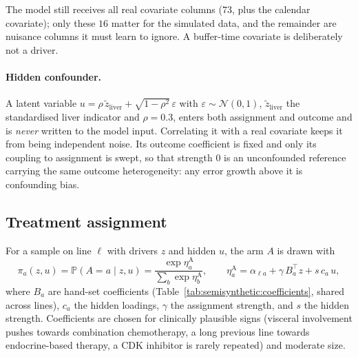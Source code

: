 The model still receives all real covariate columns ($73$, plus the calendar covariate); only
these $16$ matter for the simulated data, and the remainder are nuisance columns it must
learn to ignore. A buffer-time covariate is deliberately not a driver.

\paragraph{Hidden confounder.} A latent variable
$u=\rho\,\tilde z_{\text{liver}}+\sqrt{1-\rho^2}\,\varepsilon$ with $\varepsilon\sim\mathcal{N}(0,1)$,
$\tilde z_{\text{liver}}$ the standardised liver indicator and $\rho=0.3$, enters both
assignment and outcome and is \emph{never} written to the model input. Correlating it with a
real covariate keeps it from being independent noise. Its outcome coefficient is fixed and
only its coupling to assignment is swept, so that strength $0$ is an unconfounded reference
carrying the same outcome heterogeneity: any error growth above it is confounding bias.

\subsection{Treatment assignment}
\label{app:semisynthetic:assignment}

For a sample on line $\ell$ with drivers $z$ and hidden $u$, the arm $A$ is drawn with
\begin{equation}
    \pi_a(z,u)=\mathbb{P}(A=a\mid z,u)
    =\frac{\exp\eta^{\text{A}}_a}{\sum_{b}\exp\eta^{\text{A}}_b},
    \qquad
    \eta^{\text{A}}_a=\alpha_{\ell a}+\gamma\,B_a^{\top}z+s\,c_a\,u,
    \label{eq:semisynthetic:assignment}
\end{equation}
where $B_a$ are hand-set coefficients (Table~\ref{tab:semisynthetic:coefficients}, shared
across lines), $c_a$ the hidden loadings, $\gamma$ the assignment strength, and $s$ the hidden
strength. Coefficients are chosen for clinically plausible signs (visceral involvement pushes
towards combination chemotherapy, a long previous line towards endocrine-based therapy, a CDK
inhibitor is rarely repeated) and moderate size.

